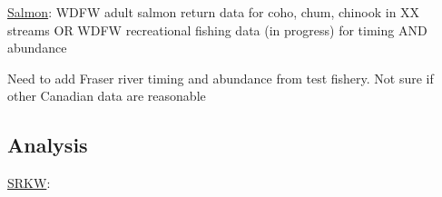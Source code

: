 \documentclass{article}
\begin{document}
\par \underline{Salmon}:  WDFW adult salmon return data for coho, chum, chinook in XX streams OR WDFW recreational fishing data (in progress) for timing AND abundance
\par Need to add Fraser river timing and abundance from test fishery. Not sure if other Canadian data are reasonable

\subsection* {Analysis}
\underline{SRKW}:
\end{document}

